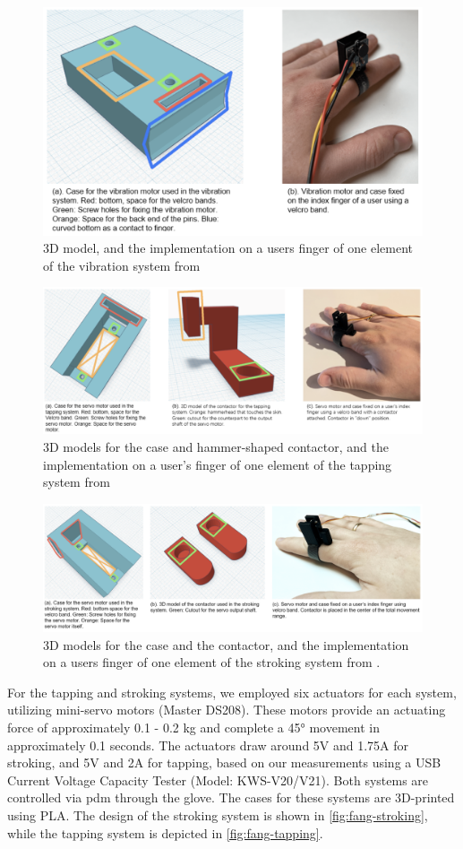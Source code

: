 \begin{figure}
     \centering
     \includegraphics[width=0.5\linewidth]{src/pictures/Screenshot 2024-09-12 at 15.11.57.png}
     \caption{3D model, and the implementation on a users finger of one element of the vibration system from \cite{Fang2023}}
     \label{fig:fang-vibration}
 \end{figure}
\begin{figure}
    \centering
    \includegraphics[width=0.5\linewidth]{src/pictures/Screenshot 2024-09-12 at 15.11.38.png}
    \caption{3D models for the case and hammer-shaped contactor, and the implementation on a user’s finger of one element of the tapping system from \cite{Fang2023}}
    \label{fig:fang-tapping}
\end{figure}
\begin{figure}
    \centering
    \includegraphics[width=0.5\linewidth]{src/pictures/Screenshot 2024-09-12 at 15.10.49.png}
    \caption{3D models for the case and the contactor, and the implementation on a users finger of one element of the stroking system from \cite{Fang2023}.}
    \label{fig:fang-stroking}
\end{figure}

For the tapping and stroking systems, we employed six actuators for each system, utilizing mini-servo motors (Master DS208). These motors provide an actuating force of approximately 0.1 - 0.2 kg and complete a 45° movement in approximately 0.1 seconds. The actuators draw around 5V and 1.75A for stroking, and 5V and 2A for tapping, based on our measurements using a 
USB Current Voltage Capacity Tester (Model: KWS-V20/V21).
Both systems are controlled via \gls{pdm} through the glove. The cases for these systems are 3D-printed using PLA. The design of the stroking system is shown in \autoref{fig:fang-stroking}, while the tapping system is depicted in \autoref{fig:fang-tapping}.

